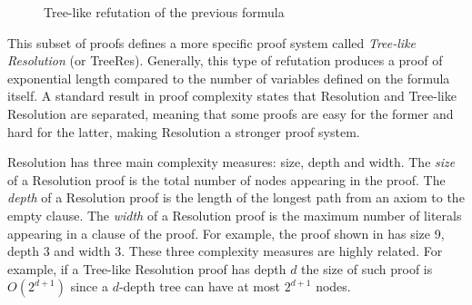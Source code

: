 \begin{figure}[H]
    \centering
    
    
    \caption{Tree-like refutation of the previous formula}
    \label{treelike_res_proof}
\end{figure}

This subset of proofs defines a more specific proof system called \textit{Tree-like Resolution} (or \textsf{TreeRes}). Generally, this type of refutation produces a proof of exponential length compared to the number of variables defined on the formula itself. A standard result in proof complexity states that Resolution and Tree-like Resolution are separated, meaning that some proofs are easy for the former and hard for the latter, making Resolution a stronger proof system.

Resolution has three main complexity measures: size, depth and width. The \textit{size} of a Resolution proof is the total number of nodes appearing in the proof. The \textit{depth} of a Resolution proof is the length of the longest path from an axiom to the empty clause. The \textit{width} of a Resolution proof is the maximum number of literals appearing in a clause of the proof. For example, the proof shown in  has size 9, depth 3 and width 3. These three complexity measures are highly related. For example, if a Tree-like Resolution proof has depth $d$ the size of such proof is $O(2^{d+1})$ since a $d$-depth tree can have at most $2^{d+1}$ nodes.

